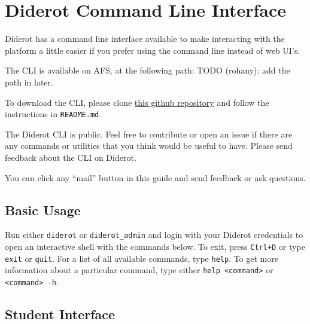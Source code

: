 \chapter{Diderot Command Line Interface}

Diderot has a command line interface available to make interacting
with the platform a little easier if you prefer using the command
line instead of web UI's.

\begin{important}

The CLI is available on AFS, at the following path: TODO (rohany): add the path in later.

To download the CLI, please clone 
%
\href{https://github.com/diderot-edu/diderot-cli}{this github repository}
%
and follow the instructions in \lstinline`README.md`. 

The Diderot CLI is public. Feel free to contribute or open an issue if there
are any commands or utilities that you think would be useful to have. Please
send feedback about the CLI on Diderot.
\end{important}

\begin{note}
You can click any ``mail''  button in this guide and send feedback or ask questions. 
\end{note}

\section{Basic Usage}

Run either \verb|diderot| or \verb|diderot_admin| and login with your Diderot credentials
to open an interactive shell with the commands below.
To exit, press \verb|Ctrl+D| or type \verb|exit| or \verb|quit|.
For a list of all available commands, type \verb|help|. To get more information
about a particular command, type either \verb|help <command>| or \verb|<command> -h|.

\section{Student Interface}

